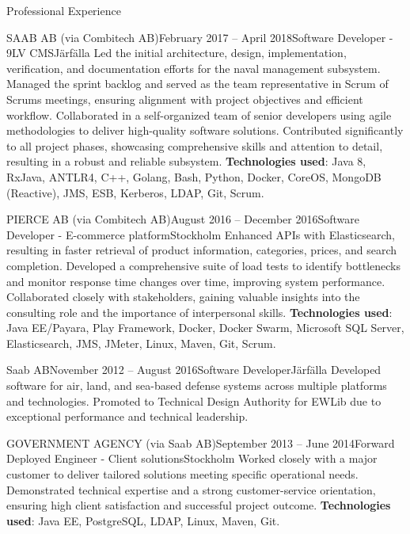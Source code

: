 \documentclass{resume}
\begin{document}
\begin{rSection}{Professional Experience}
\begin{rClientSubsection}{SAAB AB (via Combitech AB)}{February 2017 -- April 2018}{Software Developer - 9LV CMS}{Järfälla}
\bItem Led the initial architecture, design, implementation, verification, and documentation efforts for the naval management subsystem.
\bItem Managed the sprint backlog and served as the team representative in Scrum of Scrums meetings, ensuring alignment with project objectives and efficient workflow.
\bItem Collaborated in a self-organized team of senior developers using agile methodologies to deliver high-quality software solutions.
\bItem Contributed significantly to all project phases, showcasing comprehensive skills and attention to detail, resulting in a robust and reliable subsystem.
\bItem \textbf{Technologies used}: Java 8, RxJava, ANTLR4, C++, Golang, Bash, Python, Docker, CoreOS, MongoDB (Reactive), JMS, ESB, Kerberos, LDAP, Git, Scrum.
\end{rClientSubsection}

\begin{rClientSubsection}{PIERCE AB (via Combitech AB)}{August 2016 -- December 2016}{Software Developer - E-commerce platform}{Stockholm}
\bItem Enhanced APIs with Elasticsearch, resulting in faster retrieval of product information, categories, prices, and search completion.
\bItem Developed a comprehensive suite of load tests to identify bottlenecks and monitor response time changes over time, improving system performance.
\bItem Collaborated closely with stakeholders, gaining valuable insights into the consulting role and the importance of interpersonal skills.
\bItem \textbf{Technologies used}: Java EE/Payara, Play Framework, Docker, Docker Swarm, Microsoft SQL Server, Elasticsearch, JMS, JMeter, Linux, Maven, Git, Scrum.
\end{rClientSubsection}

\begin{rSubsection}{Saab AB}{November 2012 -- August 2016}{Software Developer}{Järfälla}
\bItem Developed software for air, land, and sea-based defense systems across multiple platforms and technologies.
\bItem Promoted to Technical Design Authority for EWLib due to exceptional performance and technical leadership.
\end{rSubsection}

\begin{rClientSubsection}{GOVERNMENT AGENCY (via Saab AB)}{September 2013 -- June 2014}{Forward Deployed Engineer - Client solutions}{Stockholm} %
\bItem Worked closely with a major customer to deliver tailored solutions meeting specific operational needs.
\bItem Demonstrated technical expertise and a strong customer-service orientation, ensuring high client satisfaction and successful project outcome.
\bItem \textbf{Technologies used}: Java EE, PostgreSQL, LDAP, Linux, Maven, Git.
\end{rClientSubsection}


\end{rSection}
\end{document}
